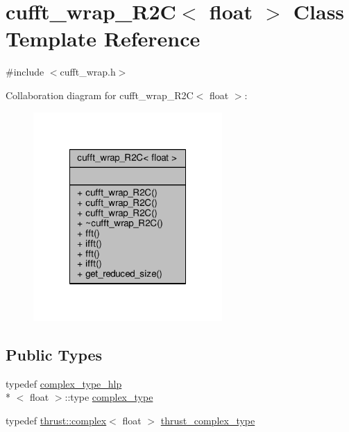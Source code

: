 \hypertarget{classcufft__wrap__R2C_3_01float_01_4}{\section{cufft\-\_\-wrap\-\_\-\-R2\-C$<$ float $>$ Class Template Reference}
\label{classcufft__wrap__R2C_3_01float_01_4}
}


{\ttfamily \#include $<$cufft\-\_\-wrap.\-h$>$}



Collaboration diagram for cufft\-\_\-wrap\-\_\-\-R2\-C$<$ float $>$\-:\nopagebreak
\begin{figure}[H]
\begin{center}
\leavevmode
\includegraphics[width=204pt]{classcufft__wrap__R2C_3_01float_01_4__coll__graph}
\end{center}
\end{figure}
\subsection*{Public Types}
\begin{DoxyCompactItemize}
\item 
typedef \hyperlink{structcomplex__type__hlp}{complex\-\_\-type\-\_\-hlp}\\*
$<$ float $>$\-::type \hyperlink{classcufft__wrap__R2C_3_01float_01_4_a440b94a9e77e57995d6667008b1b4adc}{complex\-\_\-type}
\item 
typedef \hyperlink{test__deflation__typedefs_8h_a25cabcac5deb559feab415e2c445d8ba}{thrust\-::complex}$<$ float $>$ \hyperlink{classcufft__wrap__R2C_3_01float_01_4_a6b4db0bf9b878d0d81cfbe7b84d1c5d3}{thrust\-\_\-complex\-\_\-type}
\end{DoxyCompactItemize}

